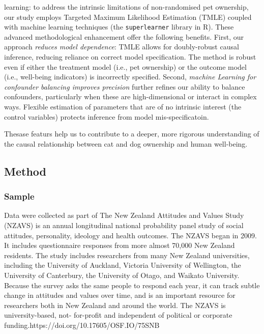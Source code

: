 \documentclass[
  singlecolumn,
  9pt]{article}
\begin{document}
\begin{enumerate}
{  learning}: to address the intrinsic limitations of non-randomised pet
  ownership, our study employs Targeted Maximum Likelihood Estimation
  (TMLE) coupled with machine learning techniques (the
  \texttt{superlearner} library in R). These advanced methodological
  enhancement offer the following benefits. First, our approach
  \emph{reduces model dependence}: TMLE allows for doubly-robust causal
  inference, reducing reliance on correct model specification. The
  method is robust even if either the treatment model (i.e., pet
  ownership) or the outcome model (i.e., well-being indicators) is
  incorrectly specified. Second, \emph{machine Learning for confounder
  balancing improves precision} further refines our ability to balance
  confounders, particularly when these are high-dimensional or interact
  in complex ways. Flexible estimation of parameters that are of no
  intrinsic interest (the control variables) protects inference from
  model mis-specificatoin.
\end{enumerate}

Thesase featurs help us to contribute to a deeper, more rigorous
understanding of the causal relationship between cat and dog ownership
and human well-being.

\subsection{Method}\label{method}

\subsubsection{Sample}\label{sample}

Data were collected as part of The New Zealand Attitudes and Values
Study (NZAVS) is an annual longitudinal national probability panel study
of social attitudes, personality, ideology and health outcomes. The
NZAVS began in 2009. It includes questionnaire responses from more
almost 70,000 New Zealand residents. The study includes researchers from
many New Zealand universities, including the University of Auckland,
Victoria University of Wellington, the University of Canterbury, the
University of Otago, and Waikato University. Because the survey asks the
same people to respond each year, it can track subtle change in
attitudes and values over time, and is an important resource for
researchers both in New Zealand and around the world. The NZAVS is
university-based, not- for-profit and independent of political or
corporate funding.https://doi.org/10.17605/OSF.IO/75SNB
\end{document}
